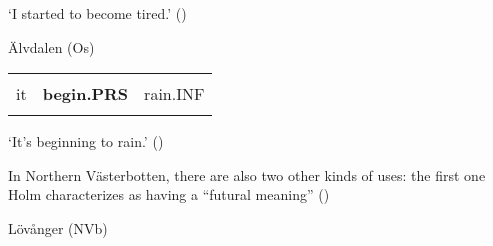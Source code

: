 \begin{styleTranslation}
‘I started to become tired.’ (\citet[19]{Holm1942})

\end{styleTranslation}

\begin{listWWNumileveli}
\item {}

\begin{styleExample}
Älvdalen (Os) 

\end{styleExample}

\end{listWWNumileveli}

\begin{tabular}{lll}
\lsptoprule
\multicolumn{3}{l}{E

}\\
it & {\bfseries begin.PRS} & rain.INF\\
\lspbottomrule
\end{tabular}

\begin{styleTranslation}
‘It’s beginning to rain.’ (\citet[115]{Levander1909})

\end{styleTranslation}

\begin{styleBodyTextFirst}
In Northern Västerbotten, there are also two other kinds of uses: the first one Holm characterizes as having a “futural meaning” (\citet[20]{Holm1941})

\end{styleBodyTextFirst}

\begin{listWWNumileveli}
\item {}

\begin{styleExample}
\label{bkm:Ref72064267}Lövånger (NVb)

\end{styleExample}

\end{listWWNumileveli}

